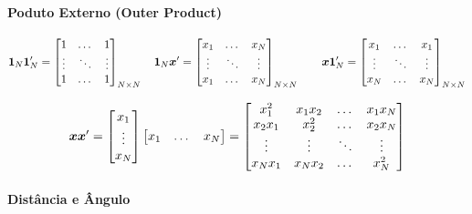 \documentclass[11pt, oneside, a4paper, article]{article}
\numberwithin{equation}{section}
\begin{document}
\begin{description}
\paragraph{Poduto Externo (Outer Product)}

\begin{align*}
\boldsymbol{1}_{N} \boldsymbol{1}_{N}' =
\begin{bmatrix}
	1 & \dots & 1	 \\
	\vdots & \ddots & \vdots \\
	1 & \dots & 1	
\end{bmatrix}_{N \times N}
\quad
\boldsymbol{1}_{N} \boldsymbol{x}' =
\begin{bmatrix}
	x_{1} & \dots & x_{N} \\
	\vdots & \ddots & \vdots \\
	x_{1} & \dots & x_{N}	
\end{bmatrix}_{N \times N}
\qquad
\boldsymbol{x} \boldsymbol{1}_{N}' =
\begin{bmatrix}
	x_{1} & \dots & x_{1} \\
	\vdots & \ddots & \vdots \\
	x_{N} & \dots & x_{N}	
\end{bmatrix}_{N \times N}
\end{align*}

\begin{align}\label{eq:xx:outer}
\boldsymbol{x} \boldsymbol{x}' =
\begin{bmatrix}
	x_{1} \\ \vdots \\ x_{N}
\end{bmatrix}
\begin{bmatrix}
	x_{1} & \dots & x_{N}
\end{bmatrix}
=
\begin{bmatrix}
	x_{1}^{2}  & x_{1} x_{2} & \dots  & x_{1}x_{N} \\
	x_{2}x_{1} & x_{2}^2     & \dots  & x_{2}x_{N} \\
	\vdots     & \vdots      & \ddots & \vdots \\
	x_{N}x_{1} & x_{N} x_{2} & \dots  & x_{N}^{2}
\end{bmatrix}
\end{align}

\paragraph{Distância e Ângulo}


\end{description}
\end{document}
